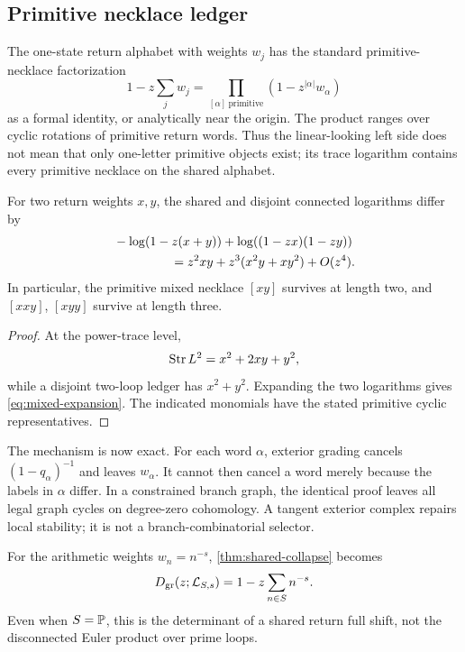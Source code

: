 \subsection{Primitive necklace ledger}

The one-state return alphabet with weights \(w_j\) has the standard
primitive-necklace factorization
\begin{equation}
 1-z\sum_jw_j
 =\prod_{[\alpha]\ \mathrm{primitive}}
   \left(1-z^{|\alpha|}w_\alpha\right)
 \label{eq:necklace-product}
\end{equation}
as a formal identity, or analytically near the origin.  The product ranges
over cyclic rotations of primitive return words.  Thus the linear-looking
left side does not mean that only one-letter primitive objects exist; its
trace logarithm contains every primitive necklace on the shared alphabet.

\begin{corollary}
\label{cor:mixed-survive}
For two return weights \(x,y\), the shared and disjoint connected logarithms
differ by
\begin{equation}
\begin{aligned}
 &-\log(1-z(x+y))
 +\log((1-zx)(1-zy))\\
 &\hspace{16mm}=z^2xy+z^3(x^2y+xy^2)+O(z^4).
\end{aligned}
 \label{eq:mixed-expansion}
\end{equation}
In particular, the primitive mixed necklace \([xy]\) survives at length
two, and \([xxy]\), \([xyy]\) survive at length three.
\end{corollary}

\begin{proof}
At the power-trace level,
\[
        \operatorname{Str} L^2=x^2+2xy+y^2,
\]
while a disjoint two-loop ledger has \(x^2+y^2\).  Expanding the two
logarithms gives \eqref{eq:mixed-expansion}.  The indicated monomials have
the stated primitive cyclic representatives.
\end{proof}

The mechanism is now exact.  For each word \(\alpha\), exterior grading
cancels \((1-q_\alpha)^{-1}\) and leaves \(w_\alpha\).  It cannot then
cancel a word merely because the labels in \(\alpha\) differ.  In a
constrained branch graph, the identical proof leaves all legal graph cycles
on degree-zero cohomology.  A tangent exterior complex repairs local
stability; it is not a branch-combinatorial selector.

For the arithmetic weights \(w_n=n^{-s}\), \cref{thm:shared-collapse}
becomes
\begin{equation}
 D_{\mathrm{gr}}(z;\mathcal L_{S,s})=1-z\sum_{n\in S}n^{-s}.
 \label{eq:shared-dirichlet}
\end{equation}
Even when \(S=\mathbb P\), this is the determinant of a shared return full shift,
not the disconnected Euler product over prime loops.
